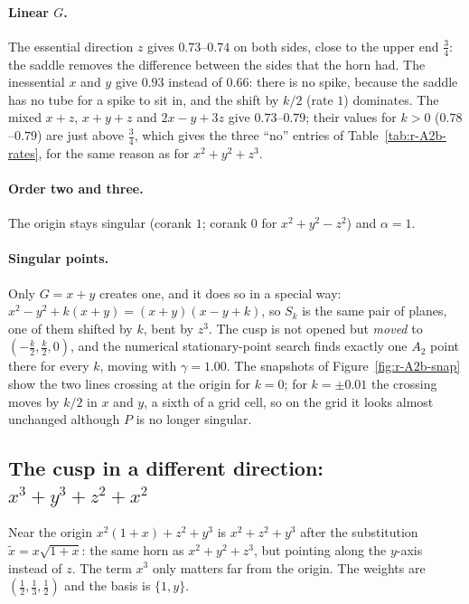 \documentclass[12pt, a4paper]{article}
\theoremstyle{plain}
\theoremstyle{definition}
\theoremstyle{remark}
\theoremstyle{definition}
\begin{document}
\paragraph{Linear $G$.} The essential direction $z$ gives $0.73$--$0.74$ on both
sides, close to the upper end $\tfrac34$: the saddle removes the difference between
the sides that the horn had. The inessential $x$ and $y$ give $0.93$ instead of
$0.66$: there is no spike, because the saddle has no tube for a spike to sit in, and
the shift by $k/2$ (rate $1$) dominates. The mixed $x+z$, $x+y+z$ and $2x-y+3z$ give
$0.73$--$0.79$; their values for $k>0$ ($0.78$--$0.79$) are just above $\tfrac34$,
which gives the three ``no'' entries of Table~\ref{tab:r-A2b-rates}, for the same
reason as for $x^2+y^2+z^3$.

\paragraph{Order two and three.} The origin stays singular (corank $1$; corank $0$
for $x^2+y^2-z^2$) and $\alpha=1$.

\paragraph{Singular points.} Only $G=x+y$ creates one, and it does so in a special
way: $x^2-y^2+k(x+y)=(x+y)(x-y+k)$, so $S_k$ is the same pair of planes, one of them
shifted by $k$, bent by $z^3$. The cusp is not opened but \emph{moved} to
$(-\tfrac k2,\tfrac k2,0)$, and the numerical stationary-point search finds exactly
one $A_2$ point there for every $k$, moving with $\gamma=1.00$. The snapshots of
Figure~\ref{fig:r-A2b-snap} show the two lines crossing at the origin for $k=0$; for
$k=\pm0.01$ the crossing moves by $k/2$ in $x$ and $y$, a sixth of a grid cell, so on
the grid it looks almost unchanged although $P$ is no longer singular.
\clearpage

\subsection{The cusp in a different direction: $x^3+y^3+z^2+x^2$}
\label{sec:r-A2c}

Near the origin $x^2(1+x)+z^2+y^3$ is $x^2+z^2+y^3$ after the substitution
$\tilde x=x\sqrt{1+x}$: the same horn as $x^2+y^2+z^3$, but pointing along the
$y$-axis instead of $z$. The term $x^3$ only matters far from the origin. The
weights are $(\tfrac12,\tfrac13,\tfrac12)$ and the basis is $\{1,y\}$.
\end{document}
